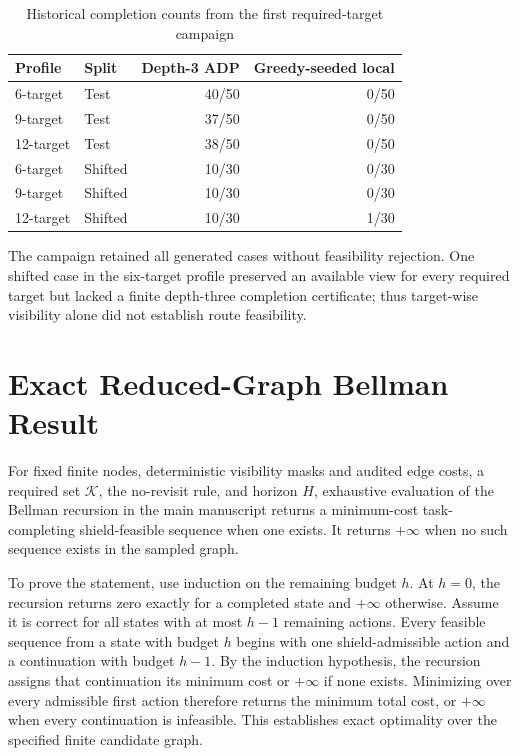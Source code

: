 \documentclass{IEEEtaes}
\begin{document}
\begin{table}[t]
  \centering
  \caption{Historical completion counts from the first required-target campaign}
  \label{tab:supp-historical-results}
  \renewcommand{\arraystretch}{1.08}
  \setlength{\tabcolsep}{5pt}
  \footnotesize
  \begin{tabular}{@{}llrr@{}}
    \toprule
    Profile & Split & Depth-3 ADP & Greedy-seeded local \\
    \midrule
    6-target & Test & 40/50 & 0/50 \\
    9-target & Test & 37/50 & 0/50 \\
    12-target & Test & 38/50 & 0/50 \\
    6-target & Shifted & 10/30 & 0/30 \\
    9-target & Shifted & 10/30 & 0/30 \\
    12-target & Shifted & 10/30 & 1/30 \\
    \bottomrule
  \end{tabular}
\end{table}

The campaign retained all generated cases without feasibility rejection. One shifted case in the six-target profile preserved an available view for every required target but lacked a finite depth-three completion certificate; thus target-wise visibility alone did not establish route feasibility.

\section{Exact Reduced-Graph Bellman Result}

For fixed finite nodes, deterministic visibility masks and audited edge costs, a required set $\mathcal K$, the no-revisit rule, and horizon $H$, exhaustive evaluation of the Bellman recursion in the main manuscript returns a minimum-cost task-completing shield-feasible sequence when one exists. It returns $+\infty$ when no such sequence exists in the sampled graph.

To prove the statement, use induction on the remaining budget $h$. At $h=0$, the recursion returns zero exactly for a completed state and $+\infty$ otherwise. Assume it is correct for all states with at most $h-1$ remaining actions. Every feasible sequence from a state with budget $h$ begins with one shield-admissible action and a continuation with budget $h-1$. By the induction hypothesis, the recursion assigns that continuation its minimum cost or $+\infty$ if none exists. Minimizing over every admissible first action therefore returns the minimum total cost, or $+\infty$ when every continuation is infeasible. This establishes exact optimality over the specified finite candidate graph.
\end{document}
